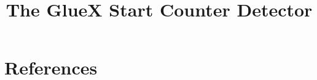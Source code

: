 \documentclass[review,twocolumn,3p]{elsarticle}
\begin{document}
\begin{frontmatter}
\title{The GlueX Start Counter Detector}	



\end{frontmatter}

\linenumbers

\section*{References}

\end{document}
